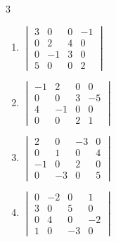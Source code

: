 \begin{multicols}{3}
\begin{enumerate}[label=\arabic*.,  leftmargin=*]
\item $\begin{vmatrix}3&0&0&-1\\0&2&4&0\\0&-1&3&0\\5&0&0&2\end{vmatrix}$
\item $\begin{vmatrix}-1&2&0&0\\0&0&3&-5\\4&-1&0&0\\0&0&2&1\end{vmatrix}$
\item $\begin{vmatrix}2&0&-3&0\\0&1&0&4\\-1&0&2&0\\0&-3&0&5\end{vmatrix}$
\item $\begin{vmatrix}0&-2&0&1\\3&0&5&0\\0&4&0&-2\\1&0&-3&0\end{vmatrix}$
\end{enumerate}
\end{multicols}
\bigskip

